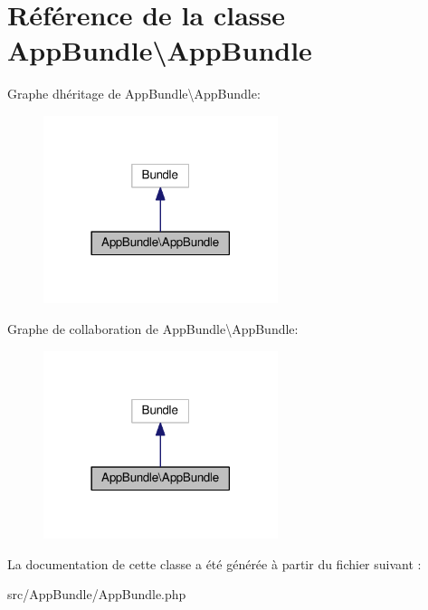 \hypertarget{classAppBundle_1_1AppBundle}{}\section{Référence de la classe App\+Bundle\textbackslash{}App\+Bundle}
\label{classAppBundle_1_1AppBundle}


Graphe d\textquotesingle{}héritage de App\+Bundle\textbackslash{}App\+Bundle\+:\nopagebreak
\begin{figure}[H]
\begin{center}
\leavevmode
\includegraphics[width=194pt]{classAppBundle_1_1AppBundle__inherit__graph}
\end{center}
\end{figure}


Graphe de collaboration de App\+Bundle\textbackslash{}App\+Bundle\+:\nopagebreak
\begin{figure}[H]
\begin{center}
\leavevmode
\includegraphics[width=194pt]{classAppBundle_1_1AppBundle__coll__graph}
\end{center}
\end{figure}


La documentation de cette classe a été générée à partir du fichier suivant \+:\begin{DoxyCompactItemize}
\item 
src/\+App\+Bundle/App\+Bundle.\+php\end{DoxyCompactItemize}

